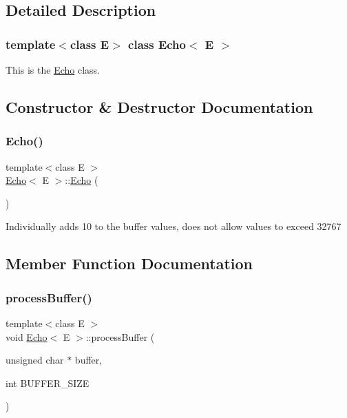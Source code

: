 \subsection{Detailed Description}
\subsubsection*{template$<$class E$>$\newline
class Echo$<$ E $>$}

This is the \hyperlink{classEcho}{Echo} class. 

\subsection{Constructor \& Destructor Documentation}
\mbox{\label{classEcho_a445e0cac428a957e2f4d97d28bb2ff75}} 
\subsubsection{\texorpdfstring{Echo()}{Echo()}}
{\footnotesize\ttfamily template$<$class E $>$ \\
\hyperlink{classEcho}{Echo}$<$ E $>$\+::\hyperlink{classEcho}{Echo} (\begin{DoxyParamCaption}{ }\end{DoxyParamCaption})}

Individually adds 10 to the buffer values, does not allow values to exceed 32767 

\subsection{Member Function Documentation}
\mbox{\label{classEcho_a3e23a70d522b79ef1e5b9df90c2af183}} 
\subsubsection{\texorpdfstring{process\+Buffer()}{processBuffer()}}
{\footnotesize\ttfamily template$<$class E $>$ \\
void \hyperlink{classEcho}{Echo}$<$ E $>$\+::process\+Buffer (\begin{DoxyParamCaption}\item[{unsigned char $\ast$}]{buffer,  }\item[{int}]{B\+U\+F\+F\+E\+R\+\_\+\+S\+I\+ZE }\end{DoxyParamCaption})\hspace{0.3cm}{\ttfamily [virtual]}}

